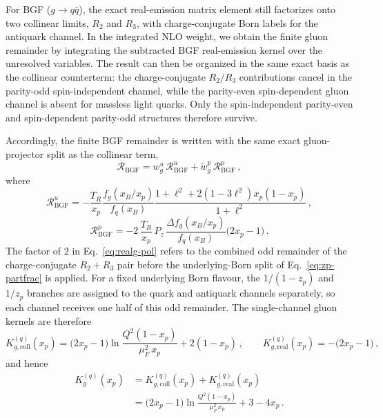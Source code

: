 \documentclass[a4paper,11pt]{article}
\begin{document}
For BGF ($g\to q\bar q$), the exact real-emission matrix element still factorizes onto two collinear limits, $R_2$ and $R_3$, with charge-conjugate Born labels for the antiquark channel.  In the integrated NLO weight, we obtain the finite gluon remainder by integrating the subtracted BGF real-emission kernel over the unresolved variables. The result can then be organized in the same exact basis as the collinear counterterm: the charge-conjugate $R_2/R_3$ contributions cancel in the parity-odd spin-independent channel, while the parity-even spin-dependent gluon channel is absent for massless light quarks.  Only the spin-independent parity-even and spin-dependent parity-odd structures therefore survive.

Accordingly, the finite BGF remainder is written with the same exact gluon-projector split as the collinear term,
\begin{equation}
  \mathcal{R}_{\text{BGF}}
  =
  w_g^{u}\,\mathcal{R}_{\text{BGF}}^{u}
  +
  \widetilde w_g^{p}\,\mathcal{R}_{\text{BGF}}^{p}\,,
  \label{eq:realg-proj}
\end{equation}
where
\begin{equation}
  \mathcal{R}_{\text{BGF}}^{u}
  =
  -\frac{T_R}{x_p}\frac{f_g(x_B/x_p)}{f_q(x_B)}
  \frac{1+\ell^2+2(1-3\ell^2)x_p(1-x_p)}{1+\ell^2}\,,
\end{equation}
\begin{equation}
  \mathcal{R}_{\text{BGF}}^{p}
  =
  -2\,\frac{T_R}{x_p}\,P_z\,\frac{\Delta f_g(x_B/x_p)}{f_q(x_B)}
  \bigl(2x_p-1\bigr)\,.
  \label{eq:realg-pol}
\end{equation}
\noindent
The factor of $2$ in Eq.~\eqref{eq:realg-pol} refers to the combined odd remainder of the charge-conjugate $R_2+R_3$ pair before the underlying-Born split of Eq.~\eqref{eq:zp-partfrac} is applied. For a fixed underlying Born flavour, the $1/(1-z_p)$ and $1/z_p$ branches are assigned to the quark and antiquark channels separately, so each channel receives one half of this odd remainder. The single-channel gluon kernels are therefore
\begin{equation}
  K_{g,\text{coll}}^{(q)}(x_p)
  =
  \bigl(2x_p-1\bigr)\ln\!\frac{Q^2(1-x_p)}{\mu_F^2\,x_p}
  +2(1-x_p)\,,
  \qquad
  K_{g,\text{real}}^{(q)}(x_p)
  =
  -\bigl(2x_p-1\bigr)\,,
\end{equation}
and hence
\begin{align}
  K_{g}^{(q)}(x_p)
  &=
  K_{g,\text{coll}}^{(q)}(x_p)+K_{g,\text{real}}^{(q)}(x_p)
  \nonumber\\
  &=
  \bigl(2x_p-1\bigr)\ln\!\frac{Q^2(1-x_p)}{\mu_F^2\,x_p}
  +3-4x_p\,.
\end{align}
\end{document}
